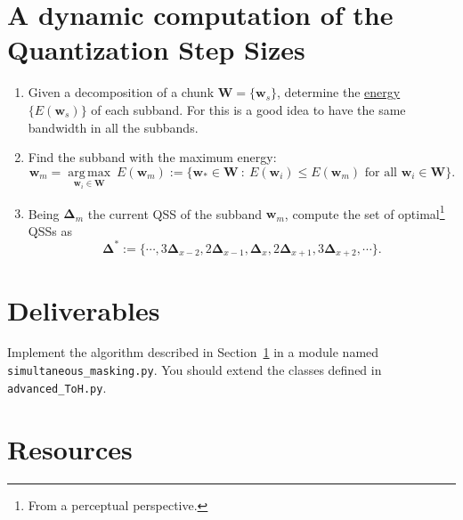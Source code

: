 \section{A dynamic computation of the Quantization Step Sizes}
\label{sec:algo}
\begin{enumerate}
\item Given a decomposition of a chunk
  ${\mathbf W}=\{{\mathbf w}_s\}$, determine the
  \href{https://en.wikipedia.org/wiki/Energy_(signal_processing)}{energy}
  $\{E({\mathbf w}_s)\}$ of each subband. For this is a good idea to
  have the same bandwidth in all the subbands.
\item Find the subband with the maximum energy:
  \begin{equation}
    {\mathbf w}_m = \underset{{\mathbf w}_i \in {\mathbf W}}{\operatorname{arg\,max}}~E({\mathbf w}_m) := \{{\mathbf w}_* \in {\mathbf W} ~:~ E({\mathbf w}_i) \leq E({\mathbf w}_m) \text{ for all } {\mathbf w}_i \in {\mathbf W} \}.
  \end{equation}
\item Being ${\mathbf \Delta}_m$ the current QSS of the subband
  ${\mathbf w}_m$, compute the set of optimal\footnote{From a
    perceptual perspective.} QSSs as
  \begin{equation}
    {\mathbf \Delta}^* := \{\cdots,3{\mathbf \Delta}_{x-2},2{\mathbf \Delta}_{x-1},{\mathbf \Delta}_x,2{\mathbf \Delta}_{x+1},3{\mathbf \Delta}_{x+2}, \cdots\}.
  \end{equation}
\end{enumerate}

\section{Deliverables}

Implement the algorithm described in Section~\ref{sec:algo} in a
module named \verb|simultaneous_masking.py|. You should extend the
classes defined in \verb|advanced_ToH.py|.

\section{Resources}



